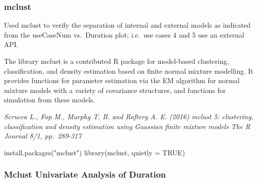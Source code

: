 \documentclass[
  letterpaper,
  DIV=11,
  numbers=noendperiod]{scrartcl}
\newenvironment{Shaded}{\begin{snugshade}}{\end{snugshade}}
\newcommand{\AttributeTok}[1]{\textcolor[rgb]{0.40,0.45,0.13}{#1}}
\newcommand{\ConstantTok}[1]{\textcolor[rgb]{0.56,0.35,0.01}{#1}}
\newcommand{\FunctionTok}[1]{\textcolor[rgb]{0.28,0.35,0.67}{#1}}
\newcommand{\NormalTok}[1]{\textcolor[rgb]{0.00,0.23,0.31}{#1}}
\newcommand{\OtherTok}[1]{\textcolor[rgb]{0.00,0.23,0.31}{#1}}
\newcommand{\SpecialCharTok}[1]{\textcolor[rgb]{0.37,0.37,0.37}{#1}}
\newcommand{\StringTok}[1]{\textcolor[rgb]{0.13,0.47,0.30}{#1}}
\begin{document}
\hypertarget{mclust}{%
\subsubsection{mclust}\label{mclust}}

Used mclust to verify the separation of internal and external models as
indicated from the useCaseNum vs.~Duration plot; i.e.~use cases 4 and 5
use an external API.

The library mclust is a contributed R package for model-based
clustering, classification, and density estimation based on finite
normal mixture modelling. It provides functions for parameter estimation
via the EM algorithm for normal mixture models with a variety of
covariance structures, and functions for simulation from these models.

\emph{Scrucca L., Fop M., Murphy T. B. and Raftery A. E. (2016) mclust
5: clustering, classification and density estimation using Gaussian
finite mixture models The R Journal 8/1, pp.~289-317}

\begin{Shaded}
\begin{Highlighting}[]
\FunctionTok{install.packages}\NormalTok{(}\StringTok{"mclust"}\NormalTok{)}
\FunctionTok{library}\NormalTok{(mclust, }\AttributeTok{quietly =} \ConstantTok{TRUE}\NormalTok{)}
\end{Highlighting}
\end{Shaded}

\hypertarget{mclust-univariate-analysis-of-duration}{%
\subsubsection{Mclust Univariate Analysis of
Duration}\label{mclust-univariate-analysis-of-duration}}

\begin{Shaded}
\end{Shaded}
\end{document}
